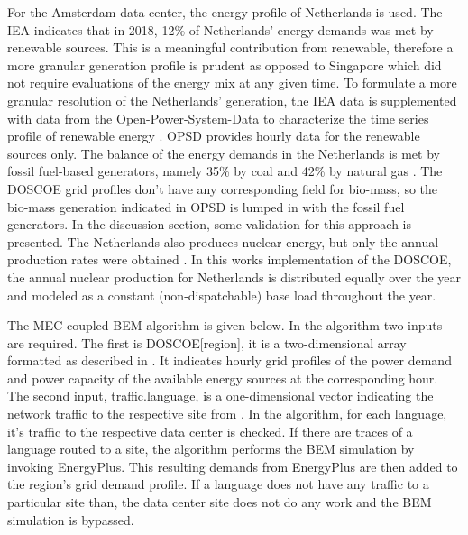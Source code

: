   For the Amsterdam data center, the energy profile of Netherlands is used. The IEA indicates that in 2018, 12\% of Netherlands' energy demands was met by renewable sources. This is a meaningful contribution from renewable, therefore a more granular generation profile is prudent as opposed to Singapore which did not require evaluations of the energy mix at any given time.  To formulate a more granular resolution of the Netherlands' generation, the IEA data is supplemented with data from the Open-Power-System-Data to characterize the time series profile of renewable energy \citep{ospd19}. OPSD provides hourly data for the renewable sources only. The balance of the energy demands in the Netherlands is met by fossil fuel-based generators, namely 35\% by coal and 42\% by natural gas \citep{eia20b}. The DOSCOE grid profiles don’t have any corresponding field for bio-mass, so the bio-mass generation indicated in OPSD is lumped in with the fossil fuel generators. In the discussion section, some validation for this approach is presented. The Netherlands also produces nuclear energy, but only the annual production rates were obtained \citep{eia20b}. In this works implementation of the DOSCOE, the annual nuclear production for Netherlands is distributed equally over the year and modeled as a constant (non-dispatchable) base load throughout the year.  

  The MEC coupled BEM algorithm is given below. In the algorithm two inputs are required. The first is DOSCOE[region], it is a two-dimensional array formatted as described in \citep{platt17}. It indicates hourly grid profiles of the power demand and power capacity of the available energy sources at the corresponding hour. The second input, traffic.language, is a one-dimensional vector indicating the network traffic to the respective site from \cite{kumar20b}. In the algorithm, for each language, it’s traffic to the respective data center is checked. If there are traces of a language routed to a site, the algorithm performs the BEM simulation by invoking EnergyPlus. This resulting demands from EnergyPlus are then added to the region’s grid demand profile. If a language does not have any traffic to a particular site than, the data center site does not do any work and the BEM simulation is bypassed.  

